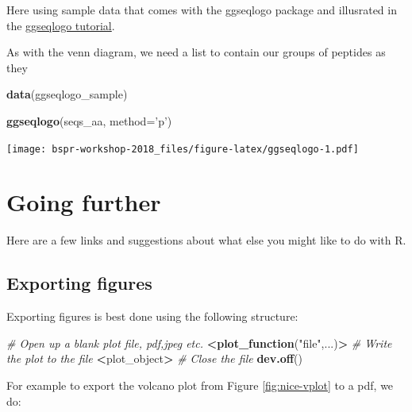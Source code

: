 \documentclass[12pt,]{book}
\newenvironment{Shaded}{\begin{snugshade}}{\end{snugshade}}
\newcommand{\KeywordTok}[1]{\textcolor[rgb]{0.13,0.29,0.53}{\textbf{#1}}}
\newcommand{\DataTypeTok}[1]{\textcolor[rgb]{0.13,0.29,0.53}{#1}}
\newcommand{\StringTok}[1]{\textcolor[rgb]{0.31,0.60,0.02}{#1}}
\newcommand{\CommentTok}[1]{\textcolor[rgb]{0.56,0.35,0.01}{\textit{#1}}}
\newcommand{\OperatorTok}[1]{\textcolor[rgb]{0.81,0.36,0.00}{\textbf{#1}}}
\newcommand{\ErrorTok}[1]{\textcolor[rgb]{0.64,0.00,0.00}{\textbf{#1}}}
\newcommand{\NormalTok}[1]{#1}
\theoremstyle{definition}
\theoremstyle{definition}
\theoremstyle{definition}
\theoremstyle{remark}
\begin{document}
Here using sample data that comes with the ggseqlogo package and
illusrated in the
\href{https://omarwagih.github.io/ggseqlogo/}{ggseqlogo tutorial}.

As with the venn diagram, we need a list to contain our groups of
peptides as they

\begin{Shaded}
\begin{Highlighting}[]
\KeywordTok{data}\NormalTok{(ggseqlogo_sample)}

\KeywordTok{ggseqlogo}\NormalTok{(seqs_aa, }\DataTypeTok{method=}\StringTok{'p'}\NormalTok{)}
\end{Highlighting}
\end{Shaded}

\texttt{[image: bspr-workshop-2018\_files/figure-latex/ggseqlogo-1.pdf]}

\chapter{Going further}\label{going-further}

Here are a few links and suggestions about what else you might like to
do with R.

\section{Exporting figures}\label{exporting-figures}

Exporting figures is best done using the following structure:

\begin{Shaded}
\begin{Highlighting}[]
\CommentTok{# Open up a blank plot file, pdf,jpeg etc.}
\OperatorTok{<}\KeywordTok{plot_function}\NormalTok{(}\StringTok{"file"}\NormalTok{,...)}\OperatorTok{>}
\CommentTok{# Write the plot to the file}
\ErrorTok{<}\NormalTok{plot_object}\OperatorTok{>}
\CommentTok{# Close the file}
\KeywordTok{dev.off}\NormalTok{()}
\end{Highlighting}
\end{Shaded}

For example to export the volcano plot from Figure \ref{fig:nice-vplot}
to a pdf, we do:
\end{document}
